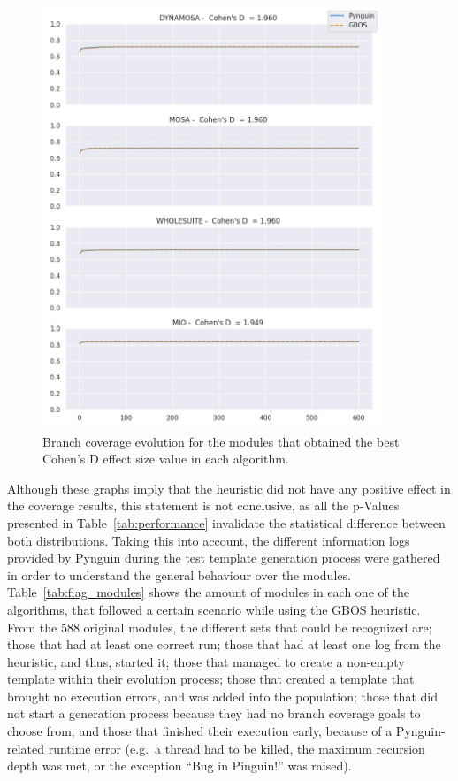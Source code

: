 \documentclass[%
  chapterprefix=false,%
  open=right,%
  twoside=true,%
  paper=a4,%
  logofile={Figures/logo.png},%
  thesistype=master,%
  UKenglish,%
]{se2thesis}
\begin{document}
\begin{figure}[ptbh]
  \centering
  \includegraphics[width=0.9\textwidth]{Figures/Results/bestES.jpg}
  \caption{Branch coverage evolution for the modules that obtained the best Cohen's D effect size value in each algorithm.}\label{fig:best}
\end{figure}

Although these graphs imply that the heuristic did not have any positive effect in the coverage results, this statement is not conclusive, as all the p-Values presented in Table~\ref{tab:performance} invalidate the statistical difference between both distributions.
Taking this into account, the different information logs provided by Pynguin during the test template generation process were gathered in order to understand the general behaviour over the modules.
Table~\ref{tab:flag_modules} shows the amount of modules in each one of the algorithms, that followed a certain scenario while using the GBOS heuristic.
From the 588 original modules, the different sets that could be recognized are; those that had at least one correct run; those that had at least one log from the heuristic, and thus, started it; those that managed to create a non-empty template within their evolution process; those that created a template that brought no execution errors, and was added into the population; those that did not start a generation process because they had no branch coverage goals to choose from; and those that finished their execution early, because of a Pynguin-related runtime error (e.g.~a thread had to be killed, the maximum recursion depth was met, or the exception ``Bug in Pinguin!'' was raised). 
\end{document}
